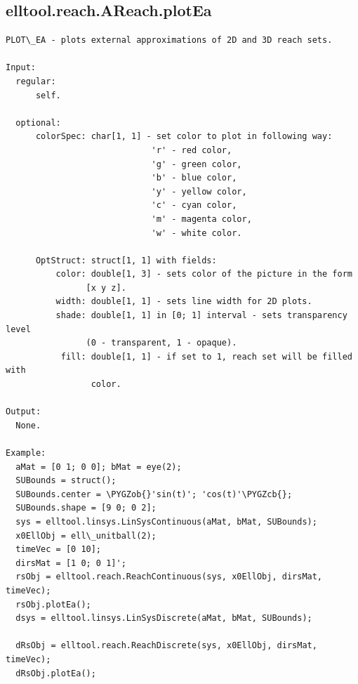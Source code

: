 \documentclass[letterpaper,10pt,english]{sphinxmanual}
\def\PYGZob{\char`\{}
\def\PYGZcb{\char`\}}
\begin{document}
\subsection{elltool.reach.AReach.plotEa}
\label{chap_functions:elltool-reach-areach-plotea}
\begin{Verbatim}[commandchars=\\\{\}]
PLOT\_EA - plots external approximations of 2D and 3D reach sets.

Input:
  regular:
      self.

  optional:
      colorSpec: char[1, 1] - set color to plot in following way:
                             'r' - red color,
                             'g' - green color,
                             'b' - blue color,
                             'y' - yellow color,
                             'c' - cyan color,
                             'm' - magenta color,
                             'w' - white color.

      OptStruct: struct[1, 1] with fields:
          color: double[1, 3] - sets color of the picture in the form
                [x y z].
          width: double[1, 1] - sets line width for 2D plots.
          shade: double[1, 1] in [0; 1] interval - sets transparency level
                (0 - transparent, 1 - opaque).
           fill: double[1, 1] - if set to 1, reach set will be filled with
                 color.

Output:
  None.

Example:
  aMat = [0 1; 0 0]; bMat = eye(2);
  SUBounds = struct();
  SUBounds.center = \PYGZob{}'sin(t)'; 'cos(t)'\PYGZcb{};
  SUBounds.shape = [9 0; 0 2];
  sys = elltool.linsys.LinSysContinuous(aMat, bMat, SUBounds);
  x0EllObj = ell\_unitball(2);
  timeVec = [0 10];
  dirsMat = [1 0; 0 1]';
  rsObj = elltool.reach.ReachContinuous(sys, x0EllObj, dirsMat, timeVec);
  rsObj.plotEa();
  dsys = elltool.linsys.LinSysDiscrete(aMat, bMat, SUBounds);

  dRsObj = elltool.reach.ReachDiscrete(sys, x0EllObj, dirsMat, timeVec);
  dRsObj.plotEa();
\end{Verbatim}
\end{document}

